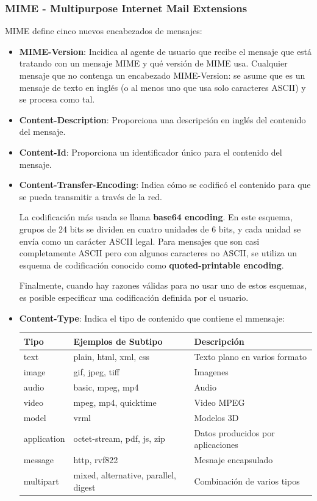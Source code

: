 \newpage
\subsubsection*{MIME - Multipurpose Internet Mail Extensions}
MIME define cinco nuevos encabezados de mensajes:
\begin{itemize}
  \item \textbf{MIME-Version}: Incidica al agente de usuario que recibe el mensaje que está tratando con un mensaje MIME y qué versión de MIME usa. Cualquier mensaje que no contenga un encabezado MIME-Version: se asume que es un mensaje de texto en inglés (o al menos uno que usa solo caracteres ASCII) y se procesa como tal.
  \item \textbf{Content-Description}: Proporciona una descripción en inglés del contenido del mensaje.
  \item \textbf{Content-Id}: Proporciona un identificador único para el contenido del mensaje.
  \item \textbf{Content-Transfer-Encoding}: Indica cómo se codificó el contenido para que se pueda transmitir a través de la red. 
  
  La codificación más usada se llama \textbf{base64 encoding}. En este esquema, grupos de 24 bits se dividen en cuatro unidades de 6 bits, y cada unidad se envía como un carácter ASCII legal. Para mensajes que son casi completamente ASCII pero con algunos caracteres no ASCII, se utiliza un esquema de codificación conocido como \textbf{quoted-printable encoding}.

  Finalmente, cuando hay razones válidas para no usar uno de estos esquemas, es posible especificar una codificación definida por el usuario.
  
  \item \textbf{Content-Type}: Indica el tipo de contenido que contiene el mmensaje:
  \begin{center}
    \begin{tabularx}{0.8\textwidth}{l|l|l}
      \textbf{Tipo} & \textbf{Ejemplos de Subtipo} & \textbf{Descripción} \\
      \hline
      text & plain, html, xml, css & Texto plano en varios formato \\
      image & gif, jpeg, tiff & Imagenes \\
      audio & basic, mpeg, mp4 & Audio \\
      video & mpeg, mp4, quicktime & Video MPEG \\
      model & vrml & Modelos 3D \\
      application & octet-stream, pdf, js, zip & Datos producidos por aplicaciones \\
      message & http, rvf822 & Mesnaje encapsulado \\
      multipart & mixed, alternative, parallel, digest & Combinación de varios tipos \\
    \end{tabularx} 
  \end{center}
\end{itemize}

